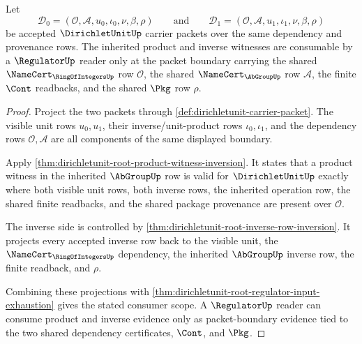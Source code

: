 \begin{theorem}
\label{thm:dirichletunit-unit-product-consumer-scope}
Let
$$
\mathcal{D}_0=(\mathcal{O},\mathcal{A},u_0,\iota_0,\nu,\beta,\rho)
\qquad\text{and}\qquad
\mathcal{D}_1=(\mathcal{O},\mathcal{A},u_1,\iota_1,\nu,\beta,\rho)
$$
be accepted $\DirichletUnitUp$ carrier packets over the same dependency and
provenance rows. The inherited product and inverse witnesses are consumable by
a $\RegulatorUp$ reader only at the packet boundary carrying the shared
$\NameCert_{\RingOfIntegersUp}$ row $\mathcal{O}$, the shared
$\NameCert_{\AbGroupUp}$ row $\mathcal{A}$, the finite $\Cont$ readbacks, and
the shared $\Pkg$ row $\rho$.
\end{theorem}
\begin{proof}
Project the two packets through
\autoref{def:dirichletunit-carrier-packet}. The visible unit rows $u_0,u_1$,
their inverse/unit-product rows $\iota_0,\iota_1$, and the dependency rows
$\mathcal{O},\mathcal{A}$ are all components of the same displayed boundary.

Apply \autoref{thm:dirichletunit-root-product-witness-inversion}. It states
that a product witness in the inherited $\AbGroupUp$ row is valid for
$\DirichletUnitUp$ exactly where both visible unit rows, both inverse rows, the
inherited operation row, the shared finite readbacks, and the shared package
provenance are present over $\mathcal{O}$.

The inverse side is controlled by
\autoref{thm:dirichletunit-root-inverse-row-inversion}. It projects every
accepted inverse row back to the visible unit, the
$\NameCert_{\RingOfIntegersUp}$ dependency, the inherited $\AbGroupUp$ inverse
row, the finite readback, and $\rho$.

Combining these projections with
\autoref{thm:dirichletunit-root-regulator-input-exhaustion} gives the stated
consumer scope. A $\RegulatorUp$ reader can consume product and inverse
evidence only as packet-boundary evidence tied to the two shared dependency
certificates, $\Cont$, and $\Pkg$.
\end{proof}

